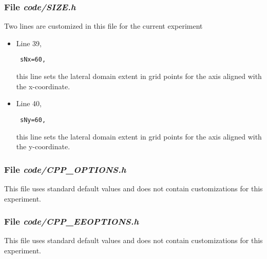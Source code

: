 \subsubsection{File {\it code/SIZE.h}}
\label{www:tutorials}

Two lines are customized in this file for the current experiment

\begin{itemize}

\item Line 39, 
\begin{verbatim} sNx=60, \end{verbatim} this line sets
the lateral domain extent in grid points for the
axis aligned with the x-coordinate.

\item Line 40, 
\begin{verbatim} sNy=60, \end{verbatim} this line sets
the lateral domain extent in grid points for the
axis aligned with the y-coordinate.

\end{itemize}

\begin{small}

\end{small}

\subsubsection{File {\it code/CPP\_OPTIONS.h}}
\label{www:tutorials}

This file uses standard default values and does not contain
customizations for this experiment.


\subsubsection{File {\it code/CPP\_EEOPTIONS.h}}
\label{www:tutorials}

This file uses standard default values and does not contain
customizations for this experiment.


